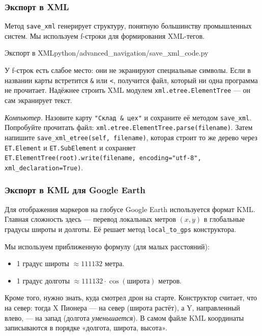 \subsubsection{Экспорт в XML}
Метод \texttt{save\_xml} генерирует структуру, понятную большинству промышленных систем. Мы используем f-строки для формирования XML-тегов.

\begin{codefiletitle}[python]{Экспорт в XML}{python/advanced_navigation/save_xml_code.py}
\end{codefiletitle}

У f-строк есть слабое место: они не экранируют специальные символы. Если в названии карты встретится \verb|&| или \verb|<|, получится файл, который ни одна программа не прочитает. Надёжнее строить XML модулем \verb|xml.etree.ElementTree| --- он сам экранирует текст.

\begin{taskbox}
\emph{Компьютер.} Назовите карту \verb|"Склад & цех"| и сохраните её методом \verb|save_xml|. Попробуйте прочитать файл: \verb|xml.etree.ElementTree.parse(filename)|. Затем напишите \verb|save_xml_etree(self, filename)|, которая строит то же дерево через \verb|ET.Element| и \verb|ET.SubElement| и сохраняет \texttt{ET.ElementTree(root).write(filename, encoding="utf-8", xml\_declaration=True)}.
\end{taskbox}

\subsubsection{Экспорт в KML для Google Earth}
Для отображения маркеров на глобусе Google Earth используется формат KML. Главная сложность здесь — перевод локальных метров $(x, y)$ в глобальные градусы широты и долготы. Её решает метод \verb|local_to_gps| конструктора.

Мы используем приближенную формулу (для малых расстояний):
\begin{itemize}
    \item 1 градус широты $\approx 111132$ метра.
    \item 1 градус долготы $\approx 111132 \cdot \cos(\text{широта})$ метров.
\end{itemize}
Кроме того, нужно знать, куда смотрел дрон на старте. Конструктор считает, что на север: тогда X Пионера --- на север (широта растёт), а Y, направленный влево, --- на запад (долгота \emph{уменьшается}). В самом файле KML координаты записываются в порядке «долгота, широта, высота».

